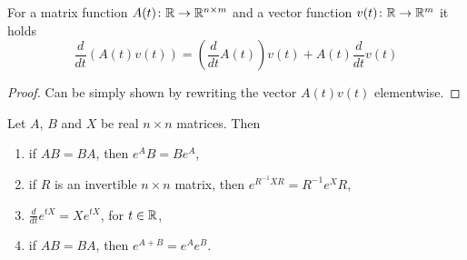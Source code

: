 \begin{lemma}
\label{lem:matrixTimesVectorDerivative}
	For a matrix function $A(t)\colon\mathbb{R}\to\mathbb{R}^{n\times m}$ and a vector function \linebreak $v(t)\colon\mathbb{R}\to\mathbb{R}^m$ it holds 
	$$\frac{d}{dt}\left(A(t)v(t)\right)=\left(\frac{d}{dt}A(t)\right)v(t)+A(t)\frac{d}{dt}v(t)$$
\end{lemma}
	
\begin{proof}
	Can be simply shown by rewriting the vector $A(t)v(t)$ elementwise.
\end{proof}

\begin{lemma}
\label{lem:expprop}
	Let $A$, $B$ and $X$ be real $n\times n$ matrices. Then 
	\begin{enumerate}
		\item if $AB = BA$, then $e^{A}B = Be^{A}$,
		\item if $R$ is an invertible $n\times n$ matrix, then $e^{R^{-1}XR}=R^{-1}e^XR$,
		\item $\frac{d}{dt}e^{tX}=Xe^{tX}$, for $t \in \mathbb{R}$,
		\item if $AB = BA$, then $e^{A+B} = e^{A}e^B$.
	\end{enumerate}
\end{lemma}

